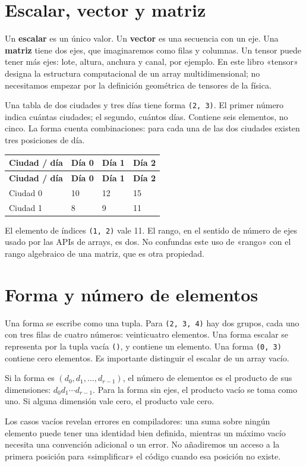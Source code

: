 \documentclass[12pt,a4paper,oneside]{report}
\begin{document}
\section{Escalar, vector y matriz}
Un \textbf{escalar} es un único valor. Un \textbf{vector} es una secuencia con un eje. Una \textbf{matriz} tiene dos ejes, que imaginaremos como filas y columnas. Un tensor puede tener más ejes: lote, altura, anchura y canal, por ejemplo. En este libro «tensor» designa la estructura computacional de un array multidimensional; no necesitamos empezar por la definición geométrica de tensores de la física.

Una tabla de dos ciudades y tres días tiene forma \texttt{(2, 3)}. El primer número indica cuántas ciudades; el segundo, cuántos días. Contiene seis elementos, no cinco. La forma cuenta combinaciones: para cada una de las dos ciudades existen tres posiciones de día.

{\small
\begin{longtable}{@{}P{0.22\textwidth}P{0.23\textwidth}P{0.23\textwidth}P{0.23\textwidth}@{}}
\toprule
\textbf{Ciudad / día} & \textbf{Día 0} & \textbf{Día 1} & \textbf{Día 2}\\
\midrule
\endfirsthead
\toprule
\textbf{Ciudad / día} & \textbf{Día 0} & \textbf{Día 1} & \textbf{Día 2}\\
\midrule
\endhead
Ciudad 0 & 10 & 12 & 15\\
Ciudad 1 & 8 & 9 & 11\\
\bottomrule
\end{longtable}
}
El elemento de índices \texttt{(1, 2)} vale 11. El rango, en el sentido de número de ejes usado por las APIs de arrays, es dos. No confundas este uso de «rango» con el rango algebraico de una matriz, que es otra propiedad.

\section{Forma y número de elementos}
Una forma se escribe como una tupla. Para \texttt{(2, 3, 4)} hay dos grupos, cada uno con tres filas de cuatro números: veinticuatro elementos. Una forma escalar se representa por la tupla vacía \texttt{()}, y contiene un elemento. Una forma \texttt{(0, 3)} contiene cero elementos. Es importante distinguir el escalar de un array vacío.

\begin{traduccion}
Si la forma es $(d_0,d_1,\ldots,d_{r-1})$, el número de elementos es el producto de sus dimensiones: $d_0d_1\cdots d_{r-1}$. Para la forma sin ejes, el producto vacío se toma como uno. Si alguna dimensión vale cero, el producto vale cero.

\end{traduccion}
Los casos vacíos revelan errores en compiladores: una suma sobre ningún elemento puede tener una identidad bien definida, mientras un máximo vacío necesita una convención adicional o un error. No añadiremos un acceso a la primera posición para «simplificar» el código cuando esa posición no existe.
\end{document}
